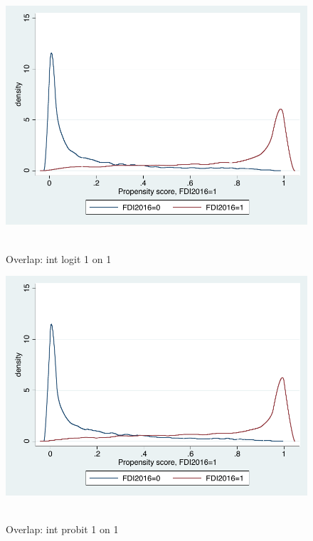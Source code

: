 \begin{figure}
	\centering
	\includegraphics[scale=0.6]{figures_and_tables/3_overlap_intlogit1o1.pdf}\
	\caption{Overlap: int logit 1 on 1 }
	\label{ol_intlog1}
\end{figure}

\begin{figure}
	\centering
	\includegraphics[scale=0.6]{figures_and_tables/3_overlap_intprobit1o1.pdf}\
	\caption{Overlap: int probit 1 on 1 }
	\label{ol_intprob1}
\end{figure}

